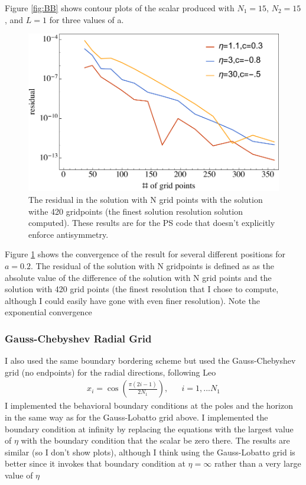 \documentclass[aps,prd,amsmath,showpacs,amssymb,superscriptaddress,nofootinbib,longbibliography,eqsecnum,preprintnumbers]{revtex4-1}
\begin{document}
Figure \ref{fig:BB} shows contour plots of the scalar produced with $N_1=15$, $N_2=15$, and $L=1$ for three values of a.

\begin{figure}[t]
\includegraphics[width =0.9\columnwidth]{BBscalingplot}
\caption{The residual in the solution with N grid points with the solution withe 420 gridpoints (the finest solution resolution solution computed). These results are for the PS code that doesn't explicitly enforce antisymmetry.
}
\label{fig:BBscaling}
\end{figure}

Figure \ref{fig:BBscaling} shows the convergence of the result for several different positions for $a=0.2$. The residual of the solution with N gridpoints is defined as as the absolute value of the difference of the solution with N grid points and the solution with 420 grid points (the finest resolution that I chose to compute, although I could easily have gone with even finer resolution). Note the exponential convergence




\subsubsection{Gauss-Chebyshev Radial Grid}

I also used the same boundary bordering scheme but used the Gauss-Chebyshev grid (no endpoints) for the radial directions, following Leo
\begin{align}
&x_i=\cos\left(\frac{\pi(2i-1)}{2N_1}\right),& &i=1,...N_1&
\end{align}
I implemented the behavioral boundary conditions at the poles and the horizon in the same way as for the Gauss-Lobatto grid above. I implemented the boundary condition at infinity by replacing the equations with the largest value of $\eta$ with  the boundary condition that the scalar be zero there. The results are similar (so I don't show plots), although I think using the Gauss-Lobatto grid is better since it invokes that boundary condition at $\eta =\infty$ rather than a very large value of $\eta$
\end{document}
